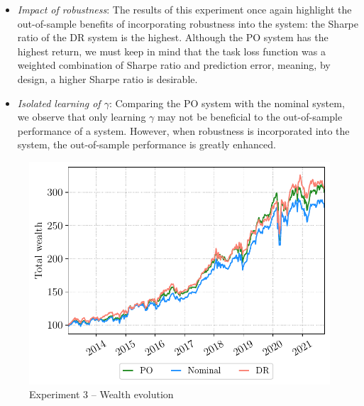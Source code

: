 \documentclass[10pt, twocolumn]{article}
\theoremstyle{plain}
\theoremstyle{definition}
\begin{document}
\begin{itemize}[itemsep=-0.15em, topsep=0pt, leftmargin=*]

\item \emph{Impact of robustness}: The results of this experiment once again 
  highlight the out-of-sample benefits of incorporating robustness into the 
  system: the Sharpe ratio of the DR system is the highest. Although the PO
  system has the highest return, we must keep in mind that the task loss 
  function was a weighted combination of Sharpe ratio and prediction error, 
  meaning, by design, a higher Sharpe ratio is desirable.
  
\item \emph{Isolated learning of \(\gamma\)}: Comparing the PO system with the 
  nominal system, we observe that only learning \(\gamma\) may not be beneficial 
  to the out-of-sample performance of a system. However, when robustness is 
  incorporated into the system, the out-of-sample performance is greatly enhanced. 

\end{itemize}

\begin{figure}[ht]
\begin{center}
\centerline{\includegraphics[width=\columnwidth]{figs/wealth_exp3.pdf}}
\caption{Experiment 3 -- Wealth evolution}
\label{fig:exp3_wealth}
\end{center}
\vskip -0.2in
\end{figure}
\end{document}
